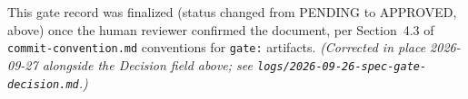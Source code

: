 \documentclass[11pt,a4paper]{article}
\begin{document}
\noindent This gate record was finalized (status changed from PENDING to
APPROVED, above) once the human reviewer confirmed the document, per
Section~4.3 of \texttt{commit-convention.md} conventions for \texttt{gate:}
artifacts. \emph{(Corrected in place 2026-09-27 alongside the Decision
field above; see \texttt{logs/2026-09-26-spec-gate-decision.md}.)}
\end{document}
